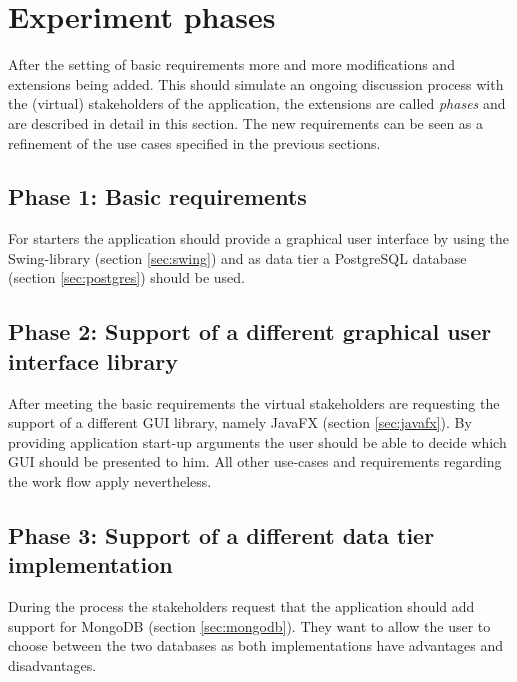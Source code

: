 \section{Experiment phases}
After the setting of basic requirements more and more modifications and extensions being added. This should simulate an ongoing discussion process with the (virtual) stakeholders of the application, the extensions are called \emph{phases} and are described in detail in this section. The new requirements can be seen as a refinement of the use cases specified in the previous sections.

\subsection{Phase 1: Basic requirements} 
For starters the application should provide a graphical user interface by using the Swing-library (section \ref{sec:swing}) and as data tier a PostgreSQL database (section \ref{sec:postgres}) should be used.

\subsection{Phase 2: Support of a different graphical user interface library}
After meeting the basic requirements the virtual stakeholders are requesting the support of a different GUI library, namely JavaFX (section \ref{sec:javafx}). By providing application start-up arguments the user should be able to decide which GUI should be presented to him. All other use-cases and requirements regarding the work flow apply nevertheless.

\subsection{Phase 3: Support of a different data tier implementation}
During the process the stakeholders request that the application should add support for MongoDB (section \ref{sec:mongodb}). They want to allow the user to choose between the two databases as both implementations have advantages and disadvantages. 


